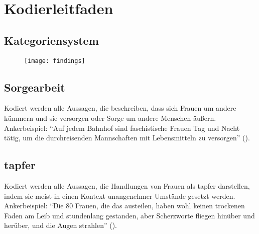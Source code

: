 \documentclass[12pt, titlepage=true, toc=bib]{scrartcl}
\begin{document}
\newpage

\nocite{medici_faschistische_1941}
\nocite{a._v._s._kameradschaft_1936}
\nocite{maltzahn_deutsche_1936}
\nocite{reimer_glucklich_1941}
\nocite{scholtz-klink_frauen_1936}
\nocite{weinhandl_wie_1941}
\nocite{friewart_japanisches_1941}


\printbibheading[title=Literaturverzeichnis]
\printbibliography[heading=subbibliography, keyword={Quelle}, title={Quellen}]
\printbibliography[heading=subbibliography, notkeyword={Quelle}]
\newpage

\appendix

\addpart{\appendixname}

\section{Kodierleitfaden}

\subsection*{Kategoriensystem}

\begin{figure}[htbp] %

\texttt{[image: findings]}
\end{figure}


\subsection*{Sorgearbeit}

Kodiert werden alle Aussagen, die beschreiben, dass sich Frauen um andere kümmern und sie versorgen oder Sorge um andere Menschen äußern.\\
Ankerbeispiel: "`Auf jedem Bahnhof sind faschistische Frauen Tag und Nacht tätig, um die durchreisenden Mannschaften mit Lebensmitteln zu versorgen"' (\cite[3]{medici_faschistische_1941}).

\subsection*{tapfer}

Kodiert werden alle Aussagen, die Handlungen von Frauen als tapfer darstellen, indem sie meist in einen Kontext unangenehmer Umstände gesetzt werden.\\
Ankerbeispiel: "`Die 80 Frauen, die das austeilen, haben wohl keinen trockenen Faden am Leib und stundenlang gestanden, aber Scherzworte fliegen hinüber und herüber, und die Augen strahlen"' (\cite[775]{a._v._s._kameradschaft_1936}).
\end{document}
